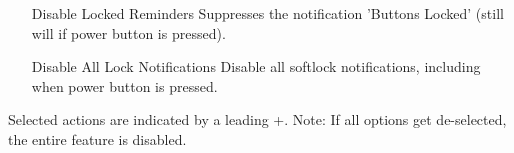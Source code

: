 {\begin{description}
\begin{itemize}
{                } %
                \item[Disable Locked Reminders]
                Suppresses the notification 'Buttons Locked'
                    (still will if power button is pressed).
                \item[Disable All Lock Notifications]
                Disable all softlock notifications, including when power button
                is pressed.

                \end{itemize}
        Selected actions are indicated by a leading +.
        Note: If all options get de-selected, the entire feature is disabled.

        \end{description}
} %


